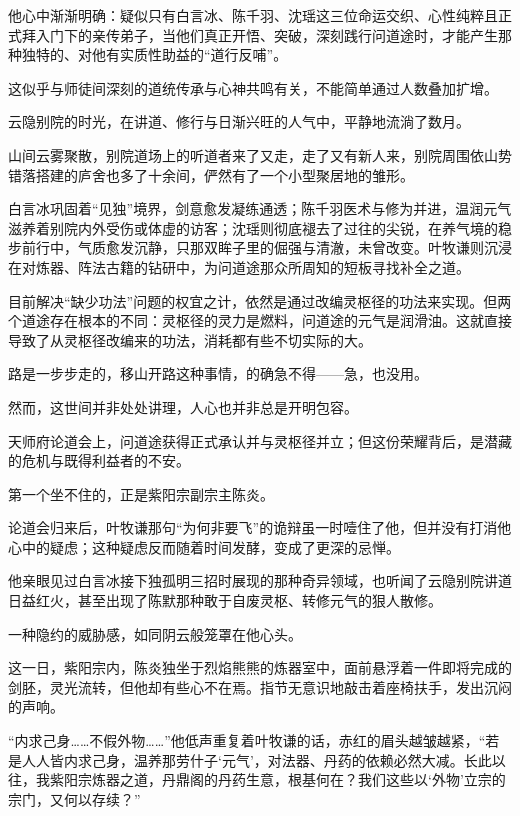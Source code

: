 他心中渐渐明确：疑似只有白言冰、陈千羽、沈瑶这三位命运交织、心性纯粹且正式拜入门下的亲传弟子，当他们真正开悟、突破，深刻践行问道途时，才能产生那种独特的、对他有实质性助益的“道行反哺”。

这似乎与师徒间深刻的道统传承与心神共鸣有关，不能简单通过人数叠加扩增。

\vspace{2em}

云隐别院的时光，在讲道、修行与日渐兴旺的人气中，平静地流淌了数月。

山间云雾聚散，别院道场上的听道者来了又走，走了又有新人来，别院周围依山势错落搭建的庐舍也多了十余间，俨然有了一个小型聚居地的雏形。

白言冰巩固着“见独”境界，剑意愈发凝练通透；陈千羽医术与修为并进，温润元气滋养着别院内外受伤或体虚的访客；沈瑶则彻底褪去了过往的尖锐，在养气境的稳步前行中，气质愈发沉静，只那双眸子里的倔强与清澈，未曾改变。叶牧谦则沉浸在对炼器、阵法古籍的钻研中，为问道途那众所周知的短板寻找补全之道。

目前解决“缺少功法”问题的权宜之计，依然是通过改编灵枢径的功法来实现。但两个道途存在根本的不同：灵枢径的灵力是燃料，问道途的元气是润滑油。这就直接导致了从灵枢径改编来的功法，消耗都有些不切实际的大。

路是一步步走的，移山开路这种事情，的确急不得——急，也没用。

\vspace{2em}

然而，这世间并非处处讲理，人心也并非总是开明包容。

天师府论道会上，问道途获得正式承认并与灵枢径并立；但这份荣耀背后，是潜藏的危机与既得利益者的不安。

第一个坐不住的，正是紫阳宗副宗主陈炎。

论道会归来后，叶牧谦那句“为何非要飞”的诡辩虽一时噎住了他，但并没有打消他心中的疑虑；这种疑虑反而随着时间发酵，变成了更深的忌惮。

他亲眼见过白言冰接下独孤明三招时展现的那种奇异领域，也听闻了云隐别院讲道日益红火，甚至出现了陈默那种敢于自废灵枢、转修元气的狠人散修。

一种隐约的威胁感，如同阴云般笼罩在他心头。

这一日，紫阳宗内，陈炎独坐于烈焰熊熊的炼器室中，面前悬浮着一件即将完成的剑胚，灵光流转，但他却有些心不在焉。指节无意识地敲击着座椅扶手，发出沉闷的声响。

“内求己身……不假外物……”他低声重复着叶牧谦的话，赤红的眉头越皱越紧，“若是人人皆内求己身，温养那劳什子‘元气’，对法器、丹药的依赖必然大减。长此以往，我紫阳宗炼器之道，丹鼎阁的丹药生意，根基何在？我们这些以‘外物’立宗的宗门，又何以存续？”

